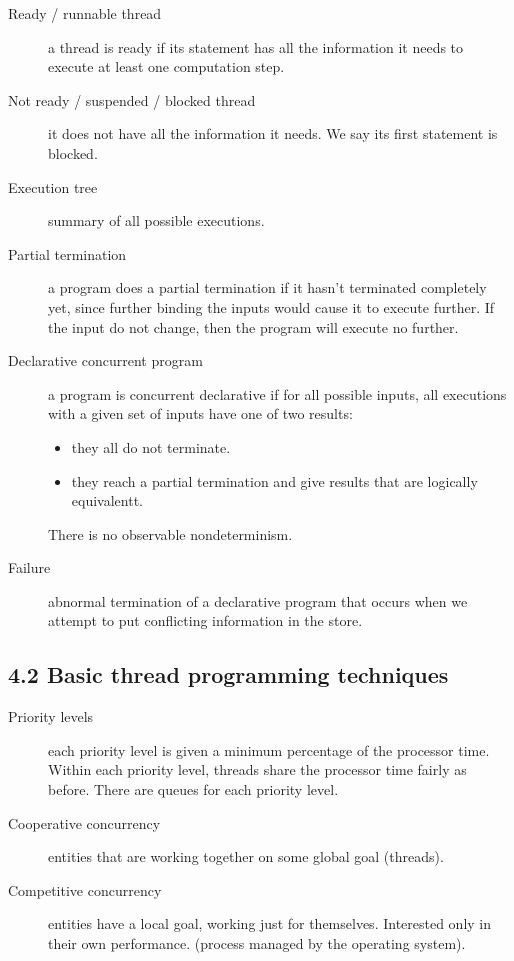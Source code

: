 \begin{description}
  \item[Ready / runnable thread] a thread is ready if its statement has all the information it needs to execute at least one computation step.
  \item[Not ready / suspended / blocked thread] it does not have all the information it needs.
    We say its first statement is blocked.
  \item[Execution tree] summary of all possible executions.
  \item[Partial termination] a program does a partial termination if it hasn't terminated completely yet, since further binding the inputs would cause it to execute further.
    If the input do not change, then the program will execute no further.
  \item[Declarative concurrent program] a program is concurrent declarative if for all possible inputs, all executions with a given set of inputs have one of two results:
    \begin{itemize}
      \item they all do not terminate.
      \item they reach a partial termination and give results that are logically equivalentt.
    \end{itemize}
    There is no observable nondeterminism.
  \item[Failure] abnormal termination of a declarative program that occurs when we attempt to put conflicting information in the store.
\end{description}

\subsection{4.2 Basic thread programming techniques}

\begin{description}
  \item[Priority levels] each priority level is given a minimum percentage of the processor time.
    Within each priority level, threads share the processor time fairly as before.
    There are queues for each priority level.
  \item[Cooperative concurrency] entities that are working together on some global goal (threads).
  \item[Competitive concurrency] entities have a local goal, working just for themselves.
    Interested  only in their own performance.
    (process managed by the operating system).
\end{description}

